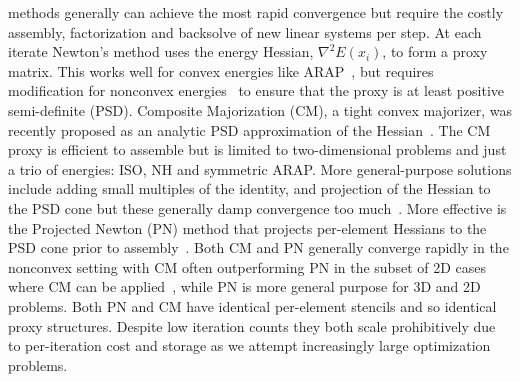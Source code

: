  methods generally can achieve the most rapid convergence
but require the costly assembly, factorization and backsolve of new
linear systems per step.  At each iterate Newton's method
uses the energy Hessian, $\nabla^2 E(x_i)$, to form a proxy matrix.
This works well for convex energies like ARAP\ \cite{Chao:2010:ASG},
but requires modification for nonconvex energies\ \cite{Nocedal:2006:Book}
to ensure that the proxy is at least positive semi-definite (PSD).
Composite Majorization (CM), a tight convex majorizer, was recently
proposed as an analytic PSD approximation of the Hessian\
\cite{Shtengel:2017:GOV}. The CM proxy is efficient to assemble but
is limited to two-dimensional problems and just a trio of energies:
ISO, NH and symmetric ARAP.  More general-purpose solutions include
adding small multiples of the identity, and projection of the Hessian
to the PSD cone but these generally damp convergence too much\
\cite{Liu:2016:TRT,Shtengel:2017:GOV,Nocedal:2006:Book}.  More
effective is the Projected Newton (PN) method that projects per-element
Hessians to the PSD cone prior to assembly\ \cite{Teran:2005:RQF}.
Both CM and PN generally converge rapidly in the nonconvex setting
with CM often outperforming PN in the subset of 2D cases where CM
can be applied\ \cite{Shtengel:2017:GOV}, while PN is more general
purpose for 3D and 2D problems.  Both PN and CM have identical
per-element stencils and so identical proxy structures. Despite low
iteration counts they both scale prohibitively due to per-iteration
cost and storage as we attempt increasingly large optimization
problems.

